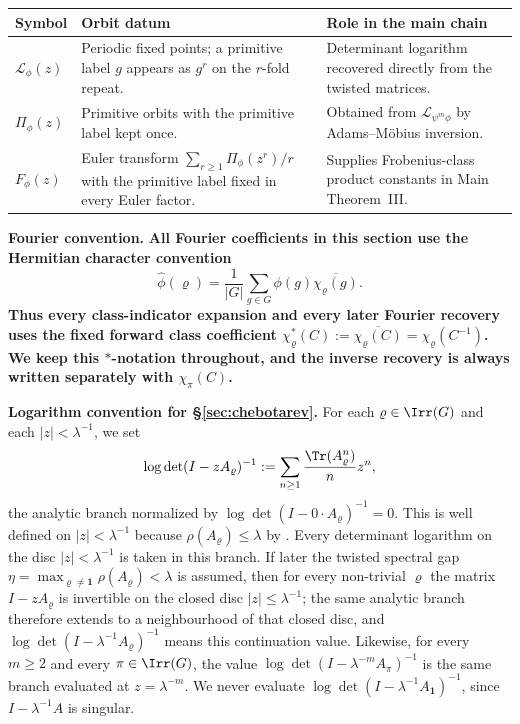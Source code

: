 \begin{center}
\renewcommand{\arraystretch}{1.18}
\begin{tabular}{L{0.25\textwidth}L{0.32\textwidth}L{0.34\textwidth}}
\toprule
Symbol & Orbit datum & Role in the main chain \\
\midrule
\(\mathcal L_\phi(z)\)
& Periodic fixed points; a primitive label \(g\) appears as \(g^r\) on
the \(r\)-fold repeat.
& Determinant logarithm recovered directly from the twisted matrices. \\
\(\Pi_\phi(z)\)
& Primitive orbits with the primitive label kept once.
& Obtained from \(\mathcal L_{\psi^m\phi}\) by Adams--M\"obius
inversion. \\
\(F_\phi(z)\)
& Euler transform \(\sum_{r\ge1}\Pi_\phi(z^r)/r\) with the primitive label
fixed in every Euler factor.
& Supplies Frobenius-class product constants in Main Theorem~III. \\
\bottomrule
\end{tabular}
\end{center}

\medskip
\noindent\textbf{Fourier convention.}
\textbf{All Fourier coefficients in this section use the Hermitian
character convention}
\[
  \widehat\phi(\varrho)
  =\frac{1}{|G|}\sum_{g\in G}\phi(g)\overline{\chi_\varrho(g)}.
\]
\textbf{Thus every class-indicator expansion and every later Fourier
recovery uses the fixed forward class coefficient
\(\chi_\varrho^\ast(C):=\overline{\chi_\varrho(C)}
=\chi_\varrho(C^{-1})\).
We keep this \(\ast\)-notation throughout, and the inverse recovery is
always written separately with \(\chi_\pi(C)\).}

\medskip
\noindent\textbf{Logarithm convention for \S\ref{sec:chebotarev}.}
For each \(\varrho\in\Irr(G)\) and each \(|z|<\lambda^{-1}\), we set
\[
  \log\det(I-zA_\varrho)^{-1}
  :=
  \sum_{n\ge 1}\frac{\Tr(A_\varrho^n)}{n}z^n,
\]
the analytic branch normalized by
\(\log\det(I-0\cdot A_\varrho)^{-1}=0\). This is well defined on
\(|z|<\lambda^{-1}\) because \(\rho(A_\varrho)\le \lambda\) by
. Every determinant logarithm
on the disc \(|z|<\lambda^{-1}\) is taken in this branch. If later the
twisted spectral gap
\(\eta=\max_{\varrho\neq\mathbf 1}\rho(A_\varrho)<\lambda\) is assumed,
then for every non-trivial \(\varrho\) the matrix \(I-zA_\varrho\) is
invertible on the closed disc \(|z|\le \lambda^{-1}\); the same analytic
branch therefore extends to a neighbourhood of that closed disc, and
\(\log\det(I-\lambda^{-1}A_\varrho)^{-1}\) means this continuation value.
Likewise, for every \(m\ge 2\) and every \(\pi\in\Irr(G)\), the value
\(\log\det(I-\lambda^{-m}A_\pi)^{-1}\) is the same branch evaluated at
\(z=\lambda^{-m}\). We never evaluate
\(\log\det(I-\lambda^{-1}A_{\mathbf 1})^{-1}\), since
\(I-\lambda^{-1}A\) is singular.


